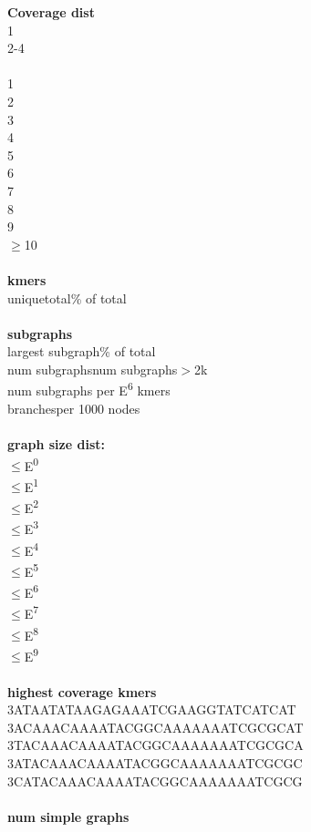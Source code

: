 \documentclass[a4paper, 12pt, oneside]{article}
\begin{document}
\textbf{Coverage dist}\\
1\\
2-4\\
\\
1\\
2\\
3\\
4\\
5\\
6\\
7\\
8\\
9\\
\(\geq\)10   \\
\\
\textbf{kmers}\\
unique\quad\quad total\quad\quad \% of total\\
\\
\textbf{subgraphs}\\
largest subgraph\quad\quad  \% of total\\
num subgraphs\quad num subgraphs\(>\)2k\\
num subgraphs per E\textsuperscript{6} kmers\\
branches\quad\quad per 1000 nodes\\
\\
\textbf{graph size dist:}\\
\(\leq\)E\textsuperscript{0}\\
\(\leq\)E\textsuperscript{1}\\
\(\leq\)E\textsuperscript{2}\\
\(\leq\)E\textsuperscript{3}\\
\(\leq\)E\textsuperscript{4}\\
\(\leq\)E\textsuperscript{5}\\
\(\leq\)E\textsuperscript{6}\\
\(\leq\)E\textsuperscript{7}\\
\(\leq\)E\textsuperscript{8}\\
\(\leq\)E\textsuperscript{9}\\
\\
\textbf{highest coverage kmers}\\
3\quad ATAATATAAGAGAAATCGAAGGTATCATCAT\\
3\quad ACAAACAAAATACGGCAAAAAAATCGCGCAT\\
3\quad TACAAACAAAATACGGCAAAAAAATCGCGCA\\
3\quad ATACAAACAAAATACGGCAAAAAAATCGCGC\\
3\quad CATACAAACAAAATACGGCAAAAAAATCGCG\\
\\
\textbf{num simple graphs}\\
\end{document}
